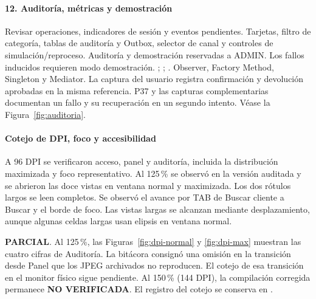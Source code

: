 \clearpage
\paragraph{12. Auditoría, métricas y demostración}
 Revisar operaciones, indicadores de sesión y eventos pendientes.
 Tarjetas, filtro de categoría, tablas de auditoría y Outbox, selector de canal y controles de simulación/reproceso.
 Auditoría y demostración reservadas a ADMIN. Los fallos inducidos requieren modo demostración.
 ; ; .
 Observer, Factory Method, Singleton y Mediator.
 La captura del usuario registra confirmación y devolución aprobadas en la misma referencia. P37 y las capturas complementarias documentan un fallo y su recuperación en un segundo intento. Véase la Figura~\ref{fig:auditoria}.

\clearpage
\paragraph{Cotejo de DPI, foco y accesibilidad}\label{sec:dpi}
A 96 DPI se verificaron acceso, panel y auditoría, incluida la distribución maximizada y foco representativo. Al 125\,\% se observó  en la versión auditada y se abrieron las doce vistas en ventana normal y maximizada. Los dos rótulos largos se leen completos. Se observó el avance por TAB de Buscar cliente a Buscar y el borde de foco. Las vistas largas se alcanzan mediante desplazamiento, aunque algunas celdas largas usan elipsis en ventana normal.


\clearpage
{} \textbf{PARCIAL}. Al 125\,\%, las Figuras~\ref{fig:dpi-normal} y \ref{fig:dpi-max} muestran las cuatro cifras de Auditoría. La bitácora consignó una omisión en la transición desde Panel que los JPEG archivados no reproducen. El cotejo de esa transición en el monitor físico sigue pendiente. Al 150\,\% (144 DPI), la compilación corregida permanece \textbf{NO VERIFICADA}. El registro del cotejo se conserva en .

\clearpage
{}


